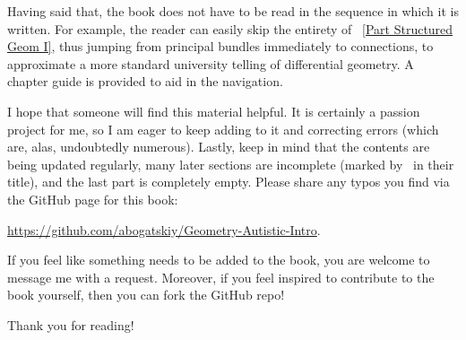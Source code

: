 Having said that, the book does not have to be read in the sequence in which it is written. For example, the reader can easily skip the entirety of \Part~\ref{Part Structured Geom I}, thus jumping from principal bundles immediately to connections, to approximate a more standard university telling of differential geometry. A chapter guide is provided to aid in the navigation.

I hope that someone will find this material helpful. It is certainly a passion project for me, so I am eager to keep adding to it and correcting errors (which are, alas, undoubtedly numerous). Lastly, keep in mind that the contents are being updated regularly, many later sections are incomplete (marked by \ucmark\ in their title), and the last part is completely empty. Please share any typos you find via the GitHub page for this book:
\begin{center}
    \url{https://github.com/abogatskiy/Geometry-Autistic-Intro}.
\end{center}
If you feel like something needs to be added to the book, you are welcome to message me with a request. Moreover, if you feel inspired to contribute to the book yourself, then you can fork the GitHub repo! 

Thank you for reading!

